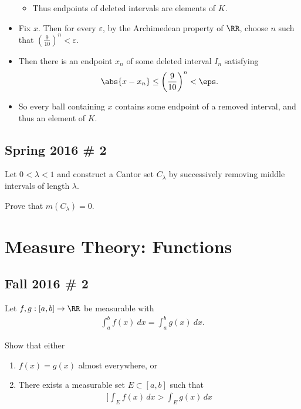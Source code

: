 \begin{solution}
\begin{itemize}
  \begin{itemize}
  \tightlist
  \item
    Thus endpoints of deleted intervals are elements of \(K\).
  \end{itemize}
\item
  Fix \(x\). Then for every \(\varepsilon\), by the Archimedean property
  of \(\RR\), choose \(n\) such that
  \(\left( \frac 9 {10} \right)^n < \varepsilon\).
\item
  Then there is an endpoint \(x_n\) of some deleted interval \(I_n\)
  satisfying
  \begin{align*}\abs{x - x_n} \leq  \left( \frac 9 {10} \right)^n < \eps.\end{align*}
\item
  So every ball containing \(x\) contains some endpoint of a removed
  interval, and thus an element of \(K\).
\end{itemize}

\end{solution}

\hypertarget{spring-2016-2}{%
\subsection{Spring 2016 \# 2}\label{spring-2016-2}}

Let \(0 < \lambda < 1\) and construct a Cantor set \(C_\lambda\) by
successively removing middle intervals of length \(\lambda\).

Prove that \(m(C_\lambda) = 0\).

\hypertarget{measure-theory-functions}{%
\section{Measure Theory: Functions}\label{measure-theory-functions}}

\hypertarget{fall-2016-2}{%
\subsection{Fall 2016 \# 2}\label{fall-2016-2}}

Let \(f, g: [a, b] \to \RR\) be measurable with
\begin{align*}
\int_{a}^{b} f(x) ~d x=\int_{a}^{b} g(x) ~d x.
\end{align*}

Show that either

\begin{enumerate}
\def\labelenumi{\arabic{enumi}.}
\tightlist
\item
  \(f(x) = g(x)\) almost everywhere, or
\item
  There exists a measurable set \(E \subset [a, b]\) such that
  \begin{align*}]
  \int _{E} f(x) \, dx > \int _{E} g(x) \, dx
  \end{align*}
\end{enumerate}

